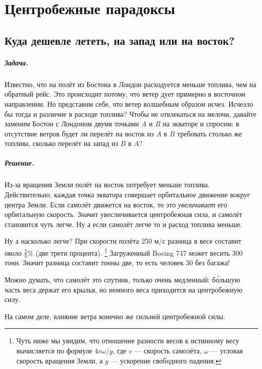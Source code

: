 \chapter{Центробежные парадоксы}

\section{Куда дешевле лететь, на запад или на восток?}

\paragraph{Задача.}
Известно, что на полёт из Бостона в Лондон расходуется меньше топлива, чем на обратный рейс.
Это происходит потому, что ветер дует примерно в восточном направлении.
Но представим себе, что ветер волшебным образом исчез.
Исчезло бы тогда и различие в расходе топлива?
Чтобы не отвлекаться на мелочи, давайте заменим Бостон с Лондоном двумя точками $A$ и $B$ на экваторе и спросим: в отсутствие ветров будет ли перелёт на восток из $A$ в $B$ требовать столько же топлива, сколько перелёт на запад из $B$ в $A$?

\paragraph{Решение.}
Из-за вращения Земли полёт на восток потребует меньше топлива.
Действительно, каждая точка экватора совершает орбитальное движение вокруг центра Земли.
Если самолёт движется на восток, то это \emph{увеличивает} его орбитальную скорость.
Значит увесличивается центробежная сила, и самолёт становится чуть легче.
Ну а если самолёт легче то и расход топлива меньше.

Ну а насколько легче?
При скорости полёта 250 м/с разница в весе составит около $
\tfrac23 \%$ (две трети процента).%
\footnote{Чуть ниже мы увидим, что отношение разности весов к истинному весу вычисляется по формуле
$4v\omega/g$,
где $v$ --- скорость самолёта,
$\omega$ --- угловая скорость вращения Земли,
а $g$ --- ускорение свободного падения.}
Загруженный Boeing 747 может весить 300 тонн.
Значит разница составит тонны две, то есть человек 30 без багажа!

Можно думать, что самолёт это спутник, только очень медленный:
б\'{о}льшую часть веса держат его крылья, но немного веса приходится на центробежную силу.

На самом деле, влияние ветра конечно же сильней центробежной силы.

